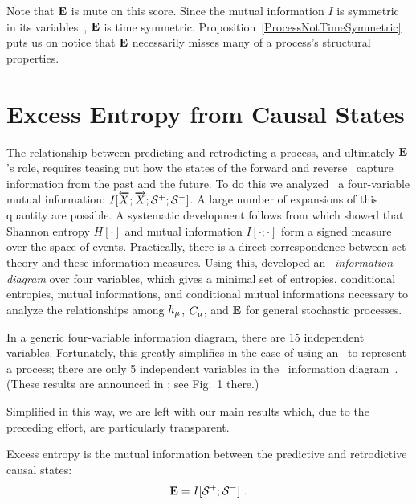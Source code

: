 Note that ${\bf E}$ is mute on this score. Since the mutual information $I$ is
symmetric in its variables~\cite{Cove06a}, ${\bf E}$ is time symmetric.
Proposition~\ref{ProcessNotTimeSymmetric} puts us on notice that ${\bf E}$
necessarily misses many of a process's structural properties.

\section{Excess Entropy from Causal States}

The relationship between predicting and retrodicting a process, and ultimately
${\bf E}$'s role, requires teasing out how the states of the forward and reverse
\eMs\ capture information from the past and the future. To do this we
analyzed~\cite{Crut08c} a four-variable mutual information:
$I[\overleftarrow {{X}};\overrightarrow{{X}};{\mathcal{S}}^{+};{\mathcal{S}}^{-}]$.
A large number of expansions of this quantity are possible. A systematic
development follows from  which showed that Shannon entropy
$H[\cdot]$ and mutual information $I[\cdot;\cdot]$ form a signed measure over
the space of events. Practically, there is a direct correspondence between set
theory and these information measures. Using this,  developed
an \emph{\eM\ information diagram} over four variables, which gives a minimal
set of entropies, conditional entropies, mutual informations, and conditional
mutual informations necessary to analyze the relationships among $h_\mu$,
$C_\mu$, and ${\bf E}$ for general stochastic processes.

In a generic four-variable information diagram, there are 15 independent
variables. Fortunately, this greatly simplifies in the case of using an \eM\ to
represent a process; there are only 5 independent variables in the \eM\
information diagram~\cite{Crut08c}. (These results are announced
in \cite{Crut08a}; see Fig.~1 there.)

Simplified in this way, we are left with our main results which, due to the
preceding effort, are particularly transparent.
\begin{The}
Excess entropy is the mutual information between the predictive and
retrodictive causal states:
\begin{equation}
{\bf E} = I[{\mathcal{S}}^{+};{\mathcal{S}}^{-}] ~.
\label{EasCausalMIEq}
\end{equation}
\label{EasCausalMI}
\end{The}

